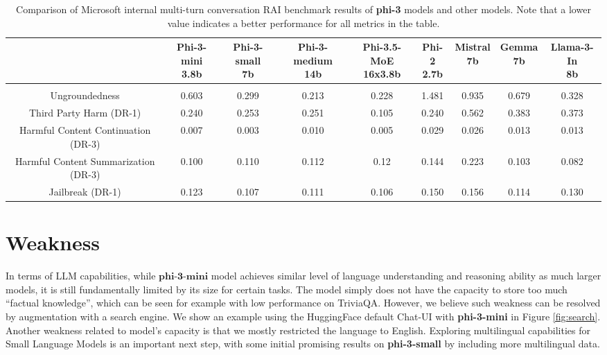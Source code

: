 \begin{table}
\begin{center}
    \begin{adjustbox}{width=0.95\textwidth,center}
    \setlength\extrarowheight{6pt}
        \begin{tabular}{ c||cccccccc } 
        & \makecell{Phi-3-mini \\ \footnotesize 3.8b} & \makecell{Phi-3-small \\ \footnotesize 7b} & \makecell{Phi-3-medium \\ \footnotesize 14b} & \makecell{Phi-3.5-MoE \\ \footnotesize 16x3.8b} & \makecell{Phi-2 \\ \footnotesize 2.7b } & \makecell{Mistral\\ \footnotesize 7b } & \makecell{Gemma \\ \footnotesize 7b} & \makecell{Llama-3-In \\ \footnotesize 8b} \\
        \hline & \\[-3.5ex]
        Ungroundedness  & 0.603 & 0.299 & 0.213 & 0.228 & 1.481 & 0.935 & 0.679 & 0.328  \\
        Third Party Harm (DR-1) & 0.240 & 0.253 & 0.251 & 0.105 & 0.240 & 0.562 & 0.383 & 0.373 \\
        Harmful Content Continuation (DR-3) & 0.007 & 0.003 & 0.010 & 0.005 & 0.029 & 0.026 & 0.013 & 0.013 \\
        Harmful Content Summarization (DR-3) & 0.100 & 0.110 & 0.112 & 0.12 & 0.144 & 0.223 & 0.103 & 0.082 \\
        Jailbreak (DR-1) & 0.123 & 0.107 & 0.111 & 0.106 & 0.150 & 0.156 & 0.114 & 0.130 \\
        \end{tabular}
    \end{adjustbox}
\end{center}
\caption{Comparison of Microsoft internal multi-turn conversation RAI benchmark results of \textbf{phi-3} models and other models. Note that a lower value indicates a better performance for all metrics in the table.}
\label{tab:rai-benchmarks}
\end{table}

\section{Weakness}
In terms of LLM capabilities, while $\textbf{phi-3-mini}$ model achieves similar level of language understanding and reasoning ability as much larger models, it is still fundamentally limited by its size for certain tasks. The model simply does not have the capacity to store too much ``factual knowledge'', which can be seen for example with low performance on TriviaQA.
However, we believe such weakness can be resolved by augmentation with a search engine. We show an example using the HuggingFace default Chat-UI with \textbf{phi-3-mini} in Figure \ref{fig:search}. Another weakness related to model's capacity is that we mostly restricted the language to English. Exploring multilingual capabilities for Small Language Models is an important next step, with some initial promising results on \textbf{phi-3-small} by including more multilingual data.

